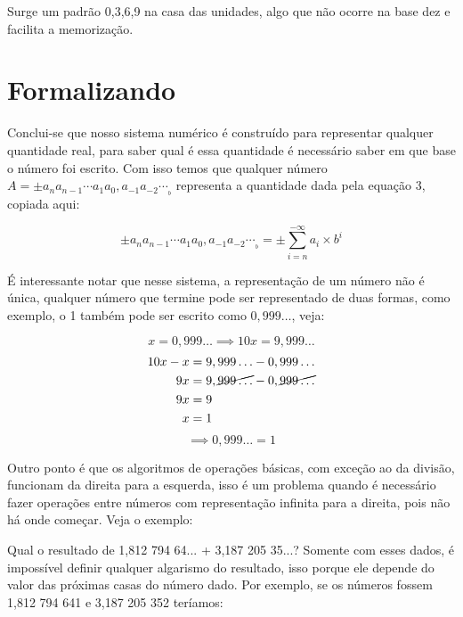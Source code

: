 \documentclass{report}
\theoremstyle{definition}
\begin{document}
Surge um padrão 0,3,6,9 na casa das unidades, algo que não ocorre na base dez e facilita a memorização.

\section{Formalizando}

Conclui-se que nosso sistema numérico é construído para representar qualquer quantidade real, para saber qual é essa quantidade é necessário saber em que base o número foi escrito. Com isso temos que qualquer número $A = \pm a_n a_{n-1} \cdots a_1 a_0 , a_{-1} a_{-2} \cdots _{_b}$ representa a quantidade dada pela equação 3, copiada aqui:

\begin{equation}
    \pm a_n a_{n-1} \cdots a_1 a_0 , a_{-1} a_{-2} \cdots _{_b} = \pm \sum_{i=n}^{-\infty}a_i \times b^i
\end{equation}

É interessante notar que nesse sistema, a representação de um número não é única, qualquer número que termine pode ser representado de duas formas, como exemplo, o 1 também pode ser escrito como $0,999\ldots$, veja:

\begin{equation*}
    x=0,999\ldots \implies 10x=9,999\ldots
\end{equation*}
\begin{align*}
    10x - x & = 9,999 \ldots - 0,999 \ldots                 \\
    9x & = 9,\cancel{999 \ldots} - 0,\cancel{999 \ldots}    \\
    9x & = 9                                                \\
    x & = 1
\end{align*}
\begin{equation*}
\implies 0,999\ldots = 1
\end{equation*}

Outro ponto é que os algoritmos de operações básicas, com exceção ao da divisão, funcionam da direita para a esquerda, isso é um problema quando é necessário fazer operações entre números com representação infinita para a direita, pois não há onde começar. Veja o exemplo:

Qual o resultado de 1,812 794 64... + 3,187 205 35...? Somente com esses dados, é impossível definir qualquer algarismo do resultado, isso porque ele depende do valor das próximas casas do número dado. Por exemplo, se os números fossem 1,812 794 641 e 3,187 205 352 teríamos:
\end{document}
